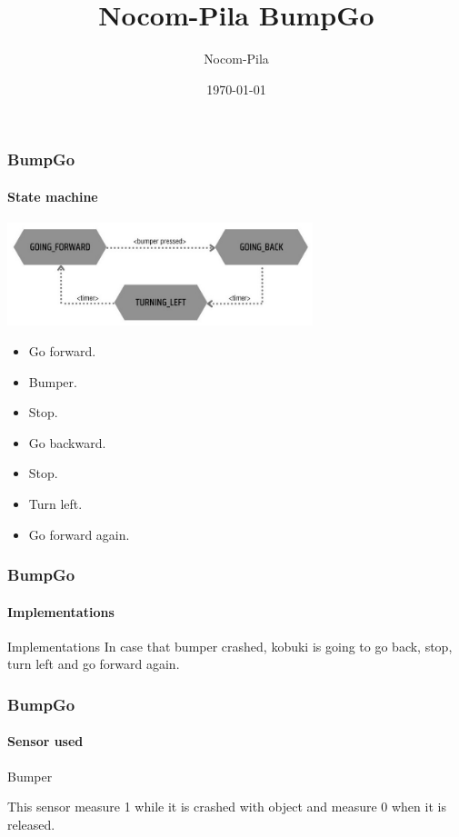 \documentclass{beamer}
\title[BumpGo]{Nocom-Pila BumpGo} %
\author{Nocom-Pila} %
\institute[URJC] %
{
Universidad Rey Juan Carlos  \\ %
\medskip
\textit{nocompila@gmail.com} %
}
\date{\today} %
\begin{document}

\begin{frame}
\titlepage %
\end{frame}
\begin{frame}

\frametitle{BumpGo} %
\framesubtitle{State machine}

\centering
\includegraphics[height=3cm]{Bumpgobasic.jpeg}

\begin{itemize}
	\item Go forward. \\ \item Bumper.\\ \item Stop.
	\item Go backward. \\ \item Stop.\\ \item Turn left.\\ \item Go forward again.
	
\end{itemize}

\end{frame}
\begin{frame}
\frametitle{BumpGo}
\framesubtitle{Implementations}
\begin{block}{Implementations}
		In case that bumper crashed, kobuki is going to go back, stop, turn left and go 			forward again.
\end{block}
\end{frame}

\begin{frame}
\frametitle{BumpGo} 
\framesubtitle{Sensor used}
\begin{block}{Bumper}
	
	This sensor measure 1 while it is crashed with object and measure 0 when it is 			    released.
	
\end{block}

\end{frame}
\end{document}
